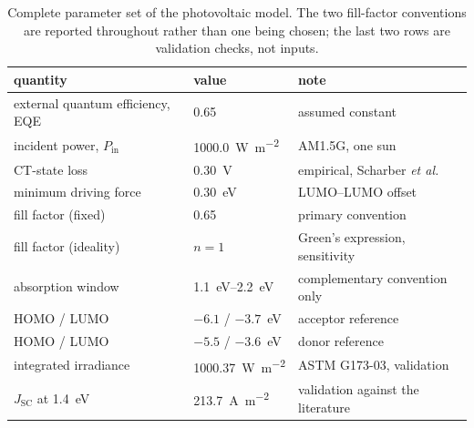 \begin{table}[t]
\centering
\caption{Complete parameter set of the photovoltaic model. The two fill-factor conventions are reported throughout rather than one being chosen; the last two rows are validation checks, not inputs.}
\label{tab:model_settings}
\begin{tabular}{lll}
\toprule
quantity & value & note \\
\midrule
external quantum efficiency, EQE & 0.65 & assumed constant \\
incident power, $P_{\mathrm{in}}$ & \qty{1000.0}{\watt\per\meter\squared} & AM1.5G, one sun \\
CT-state loss & \qty{0.30}{\volt} & empirical, Scharber \emph{et al.} \\
minimum driving force & \qty{0.30}{\electronvolt} & LUMO--LUMO offset \\
fill factor (fixed) & 0.65 & primary convention \\
fill factor (ideality) & $n = 1$ & Green's expression, sensitivity \\
absorption window & \qtyrange{1.1}{2.2}{\electronvolt} & complementary convention only \\
\PCBM{} HOMO / LUMO & $-6.1$ / $-3.7$~\unit{\electronvolt} & acceptor reference \\
\PCDTBT{} HOMO / LUMO & $-5.5$ / $-3.6$~\unit{\electronvolt} & donor reference \\
integrated irradiance & \qty{1000.37}{\watt\per\meter\squared} & ASTM G173-03, validation \\
$J_{\mathrm{SC}}$ at \qty{1.4}{\electronvolt} & \qty{213.7}{\ampere\per\meter\squared} & validation against the literature \\
\bottomrule
\end{tabular}
\end{table}

